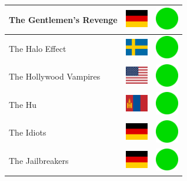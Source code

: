 \documentclass[12pt, a4paper, twoside]{report}
\begin{document}
\begin{center}
\begin{longtable}{|p{5cm}|p{2cm}|p{2cm}|}
 The Gentlemen's Revenge                                    & \includegraphics[width=1cm]{../img/flags/de} &   \includegraphics[width=1cm]{../likes/y} \\ \hline
 The Halo Effect                                            & \includegraphics[width=1cm]{../img/flags/se} &   \includegraphics[width=1cm]{../likes/y} \\ \hline
 The Hollywood Vampires                                     & \includegraphics[width=1cm]{../img/flags/us} &   \includegraphics[width=1cm]{../likes/y} \\ \hline
 The Hu                                                     & \includegraphics[width=1cm]{../img/flags/mn} &   \includegraphics[width=1cm]{../likes/y} \\ \hline
 The Idiots                                                 & \includegraphics[width=1cm]{../img/flags/de} &   \includegraphics[width=1cm]{../likes/y} \\ \hline
 The Jailbreakers                                           & \includegraphics[width=1cm]{../img/flags/de} &   \includegraphics[width=1cm]{../likes/y} \\ \hline

\end{longtable}
\end{center}
\end{document}
